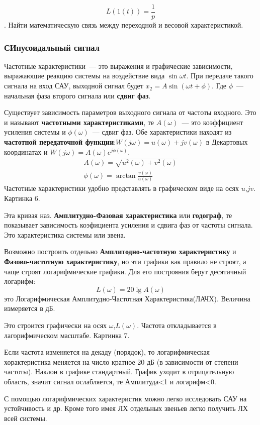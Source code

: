 	$$L(1(t))=\frac{1}{p}$$. Найти математическую связь между переходной и весовой характеристикой.
	
\subsubsection{СИнусоидальный сигнал}
	Частотные характеристики~--- это выражения и графические зависимости, выражающие реакцию системы на воздействие вида $\sin\omega{}t$. При передаче такого сигнала на вход САУ, выходной сигнал будет $x_2=A\sin(\omega{}t+\phi)$. Где $\phi$~--- начальная фаза второго сигнала или \textbf{сдвиг фаз}.
	
	Существует зависимость параметров выходного сигнала от частоты входного. Это и называют \textbf{частотными характеристиками}, те $A(\omega)$~--- это коэффициент усиления системы и $\phi(\omega)$~--- сдвиг фаз. Обе характеристики находят из \textbf{частотной передаточной функции}:$W(j\omega)=u(\omega)+jv(\omega)$ в Декартовых координатах и $W(j\omega)=A(\omega)e^{j\phi(\omega)}$.
	\begin{gather*}
		A(\omega)=\sqrt{u^2(\omega)+v^2(\omega)} \\
		\phi(\omega)=\arctan\frac{v(\omega)}{u(\omega)}
	\end{gather*}
	Частотные характеристики удобно представлять в графическом виде на осях $u$,$jv$. Картинка 6.
	
	Эта кривая наз. \textbf{Амплитудно-Фазовая характеристика} или \textbf{годограф}, те показывает зависимость коэфициента усиления и сдвига фаз от частоты сигнала. Это характеристика системы или звена.
	
	Возможно построить отдельно \textbf{Амплитодно-частотную характеристику} и \textbf{Фазово-частотную характеристику}, но эти графики как правило не строят, а чаще строят логарифмические графики. Для его построяния берут десятичный логарифм:
	$$
		L(\omega)=20\lg{}A(\omega)
	$$
	это Логарифмическая Амплитудно-Частотная Характеристика(ЛАЧХ). Величина измеряется в дБ.
	
	Это строится графически на осях $\omega$,$L(\omega)$. Частота откладывается в лагорифмическом масштабе. Картинка 7.
	
	Если частота изменяется на декаду (порядок), то логарифмическая хорактеристика меняется на число кратное 20 дБ (в зависимости от степени частоты). Наклон в графике стандартный. График уходит в отрицательную область, значит сигнал ослабляется, те Амплитуда<1 и логарифм<0.
	
	С помощью логарифмических характеристик можно легко исследовать САУ на устойчивость и др. Кроме того имея ЛХ отдельных звеньев легко получить ЛХ всей системы.

